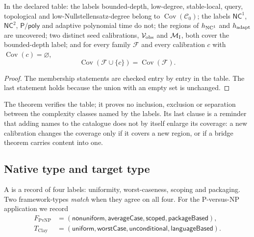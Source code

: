 

\begin{theorem}\label{thm:coverage-family-geometry}
In the declared table: the labels bounded-depth, low-degree,
stable-local, query, topological and low-Nullstellensatz-degree belong
to \(\operatorname{Cov}(\mathcal C_{0})\); the labels \(\mathsf{NC}^{1}\),
\(\mathsf{NC}^{2}\), \(\mathsf{P/poly}\) and adaptive polynomial time
do not; the regions of \(h_{\mathrm{NC}^{1}}\) and \(h_{\mathrm{adapt}}\) are uncovered;
two distinct seed calibrations, \(\mathcal{V}_{\text{obs}}\) and \(\mathcal{M}_{\text{I}}\), both cover the
bounded-depth label; and for every family \(\mathcal F\) and every
calibration \(c\) with \(\operatorname{Cov}(c)=\varnothing\),
\[
  \operatorname{Cov}(\mathcal F\cup\{c\})=\operatorname{Cov}(\mathcal F).
\]
\end{theorem}

\begin{proof}
The membership statements are checked entry by entry in the table.  The
last statement holds because the union with an empty set is unchanged.
\end{proof}

The theorem verifies the table; it proves no inclusion, exclusion or
separation between the complexity classes named by the labels.  Its
last clause is a reminder that adding names to the catalogue does not
by itself enlarge its coverage: a new calibration changes the coverage
only if it covers a new region, or if a bridge theorem carries content
into one.

\subsection{Native type and target type}
\label{sec:calibration:framework-type-self-char}

\begin{definition}\label{def:framework-type}
A \emph{\FType} is a record of four labels: uniformity, worst-caseness,
scoping and packaging.  Two framework-types \emph{match} when they agree
on all four.  For the P-versus-NP application we record
\[
\begin{aligned}
  F_{\mathrm{PvNP}}
  &=(\mathsf{nonuniform},\mathsf{averageCase},\mathsf{scoped},\mathsf{packageBased}),\\
  T_{\mathrm{Clay}}
  &=(\mathsf{uniform},\mathsf{worstCase},\mathsf{unconditional},\mathsf{languageBased}).
\end{aligned}
\]
\end{definition}

